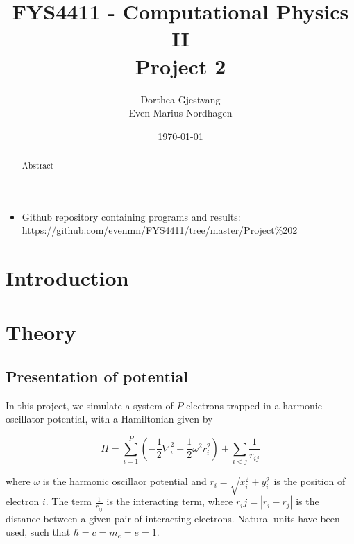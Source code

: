 \documentclass[norsk,a4paper,12pt]{article}
\title{FYS4411 - Computational Physics II\\\vspace{2mm} \Large{Project 2}}
\author{\large Dorthea Gjestvang\\ Even Marius Nordhagen}
\date\today
\begin{document}
\maketitle

\begin{itemize}
\item Github repository containing programs and results: \\\url{https://github.com/evenmn/FYS4411/tree/master/Project%202}
\end{itemize}

\begin{abstract}
Abstract
\par 

\end{abstract}

\newpage

\tableofcontents

\newpage

\section{Introduction} \label{sec:Introduction}


\section{Theory} \label{sec:Theory}
\subsection{Presentation of potential} \label{sec:Presentation_of_potential}

In this project, we simulate a system of $P$ electrons trapped in a harmonic oscillator potential, with a Hamiltonian given by

\begin{equation}
\label{eq:Hamiltonian}
\hat{H} = \sum_{i=1}^{P} (-\frac{1}{2} \nabla_i^2 + \frac{1}{2} \omega^2 r_i ^2) + \sum_{i<j} \frac{1}{r_{ij}} 
\end{equation}

where $\omega$ is the harmonic oscillaor potential and  $r_i = \sqrt{x_i^2 + y_i^2}$ is the position of electron $i$. The term $\frac{1}{r_{ij}}$ is the interacting term, where $r_ij = |r_i - r_j|$ is the distance between a given pair of interacting electrons. Natural units have been used, such that $\hbar = c = m_e = e = 1$.
\par 
\end{document}
